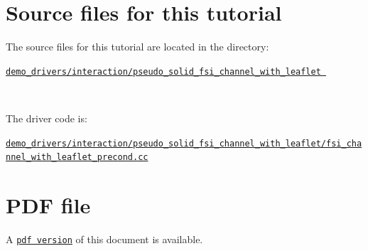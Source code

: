  

\hypertarget{index_sources}{}\section{Source files for this tutorial}\label{index_sources}

\begin{DoxyItemize}
\item The source files for this tutorial are located in the directory\+:~\newline
~\newline
\begin{center} \href{../../../../demo_drivers/interaction/pseudo_solid_fsi_channel_with_leaflet}{\tt demo\+\_\+drivers/interaction/pseudo\+\_\+solid\+\_\+fsi\+\_\+channel\+\_\+with\+\_\+leaflet } \end{center} ~\newline

\item The driver code is\+: ~\newline
~\newline
\begin{center} \href{../../../../demo_drivers/interaction/pseudo_solid_fsi_channel_with_leaflet/fsi_channel_with_leaflet_precond.cc}{\tt demo\+\_\+drivers/interaction/pseudo\+\_\+solid\+\_\+fsi\+\_\+channel\+\_\+with\+\_\+leaflet/fsi\+\_\+channel\+\_\+with\+\_\+leaflet\+\_\+precond.\+cc} \end{center} 
\end{DoxyItemize}



 

 \hypertarget{index_pdf}{}\section{P\+D\+F file}\label{index_pdf}
A \href{../latex/refman.pdf}{\tt pdf version} of this document is available. 
